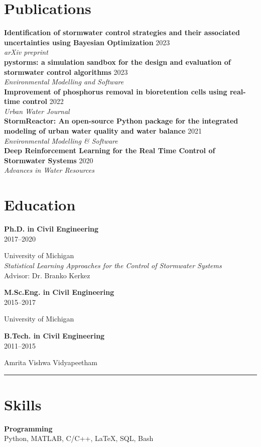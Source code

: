 \documentclass{article}
\newcommand{\degreeyear}[2]{
  {\textbf{#1}}\\
  {\small\textcolor{tuftegray}{#2}}
}
\newcommand{\divider}{\textcolor{tuftegray}{\rule{\linewidth}{0.5pt}}}
\newcommand{\publication}[3]{
  \textbf{#1} \hfill \textcolor{tuftegray}{#2}\\
  {\small\textit{#3}}\\[0.5em]
}
\begin{document}
\begin{paracol}{2}
\section{Publications}
\publication{Identification of stormwater control strategies and their associated uncertainties using Bayesian Optimization}{2023}{arXiv preprint}

\publication{pystorms: a simulation sandbox for the design and evaluation of stormwater control algorithms}{2023}{Environmental Modelling and Software}

\publication{Improvement of phosphorus removal in bioretention cells using real-time control}{2022}{Urban Water Journal}

\publication{StormReactor: An open-source Python package for the integrated modeling of urban water quality and water balance}{2021}{Environmental Modelling \& Software}

\publication{Deep Reinforcement Learning for the Real Time Control of Stormwater Systems}{2020}{Advances in Water Resources}


\switchcolumn

\begin{flushleft}

\section{Education}
\vspace{0.5em}
\degreeyear{Ph.D. in Civil Engineering}{2017--2020}
University of Michigan\\
\vspace{0.2em}
{\small\textit{Statistical Learning Approaches for the Control of Stormwater Systems}}\\
{\small Advisor: Dr. Branko Kerkez}

\vspace{0.8em}
\degreeyear{M.Sc.Eng. in Civil Engineering}{2015--2017}
University of Michigan

\vspace{0.8em}
\degreeyear{B.Tech. in Civil Engineering}{2011--2015}
Amrita Vishwa Vidyapeetham
\vspace{1em}
\divider
\vspace{1em}

\section{Skills}
\vspace{0.5em}
\textbf{Programming}\\
{\small Python, MATLAB, C/C++, \LaTeX, SQL, Bash}
\vspace{0.8em}


\end{flushleft}
\end{paracol}
\end{document}
